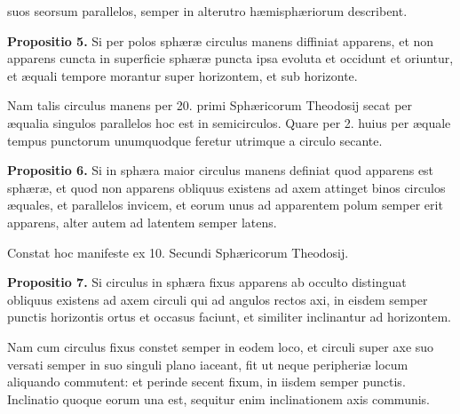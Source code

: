 \documentclass[11pt,a4paper]{article}
\begin{document}

suos seorsum parallelos, semper in alterutro hæmisphæriorum describent.

\textbf{Propositio 5.} Si per polos sphæræ circulus manens diffiniat apparens, et non apparens cuncta in superficie sphæræ puncta ipsa evoluta et occidunt et oriuntur, et æquali tempore morantur super horizontem, et sub horizonte.

Nam talis circulus manens per 20. primi Sphæricorum Theodosij secat per æqualia singulos parallelos hoc est in semicirculos. Quare per 2. huius per æquale tempus punctorum unumquodque feretur utrimque a circulo secante.

\textbf{Propositio 6.} Si in sphæra maior circulus manens definiat quod apparens est sphæræ, et quod non apparens obliquus existens ad axem attinget binos circulos æquales, et parallelos invicem, et eorum unus ad apparentem polum semper erit apparens, alter autem ad latentem semper latens.

Constat hoc manifeste ex 10. Secundi Sphæricorum Theodosij.

\textbf{Propositio 7.} Si circulus in sphæra fixus apparens ab occulto distinguat obliquus existens ad axem circuli qui ad angulos rectos axi, in eisdem semper punctis horizontis ortus et occasus faciunt, et similiter inclinantur ad horizontem.

Nam cum circulus fixus constet semper in eodem loco, et circuli super axe suo versati semper in suo singuli plano iaceant, fit ut neque peripheriæ locum aliquando commutent: et perinde secent fixum, in iisdem semper punctis. Inclinatio quoque eorum una est, sequitur enim inclinationem axis communis.
\end{document}
